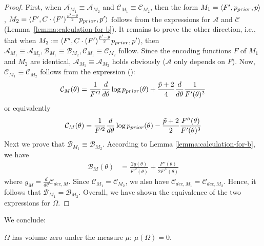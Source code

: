 \begin{proof}
  First, when $\mathcal{A}_{M_1} \equiv \mathcal{A}_{M_2}$ and $\mathcal{C}_{M_1} \equiv \mathcal{C}_{M_2}$, then the form $M_1 = \langle F',p_{prior}, p\rangle $, $M_2 = \langle F',C \cdot (F')^{\frac{\tilde{p'}-\tilde{p}}{2}} p_{prior}, p'\rangle$ follows from the expressions for $\mathcal{A}$ and $\mathcal{C}$ (Lemma~\ref{lemma:calculation-for-b}).
    It remains to prove the other direction, i.e., that when $M_2 := \langle F',C \cdot (F')^{\frac{\tilde{p}'-\tilde{p}}{2}} p_{prior}, p')$, then
    $\mathcal{A}_{M_1} \equiv \mathcal{A}_{M_2}, \mathcal{B}_{M_1} \equiv \mathcal{B}_{M_2}, \mathcal{C}_{M_1} \equiv \mathcal{C}_{M_2}$ follow.
    Since the encoding functions $F$ of $M_1$ and $M_2$ are identical, $\mathcal{A}_{M_1} \equiv \mathcal{A}_{M_2}$ holds obviously ($\mathcal{A}$ only depends on $F$).
Now, $\mathcal{C}_{M_1} \equiv \mathcal{C}_{M_2}$ follows from the expression (\label{eq:c-coefficient}):
\begin{equation}
    \mathcal{C}_M(\theta) = \frac{1}{F'^2} \frac{d}{d\theta} \log p_{prior}(\theta) + \frac{\tilde{p}+2}{4} \frac{d}{d\theta} \frac{1}{F'(\theta)^2} 
        \end{equation}
or equivalently
    \begin{equation*}
        \mathcal{C}_M(\theta) = \frac{1}{F'^2} \frac{d}{d\theta} \log p_{prior}(\theta) - \frac{\tilde{p}+2}{2}\frac{F''(\theta)}{F'(\theta)^3}
    \end{equation*}
    Next we prove that $\mathcal{B}_{M_1} \equiv \mathcal{B}_{M_2}$. According to Lemma \ref{lemma:calculation-for-b}, we have 
    \begin{align*}
    \mathcal{B}_M(\theta) &= \frac{2g(\theta)}{F'^2(\theta)} + \frac{F''(\theta)}{2F'^6(\theta)}
    \end{align*}
    where $g_M = \frac{d}{d\theta} \mathcal{C}_{dec,M}$.
    Since $\mathcal{C}_{M_1} = \mathcal{C}_{M_2}$, we also have $\mathcal{C}_{dec,M_1} = \mathcal{C}_{dec,M_2}$.
    Hence, it follows that 
    $\mathcal{B}_{M_1} = \mathcal{B}_{M_2}$. 
Overall, we have shown the equivalence of the two expressions for $\Omega$.
\end{proof}

We conclude:
\begin{corollary}\label{lemma:statements-omega}\label{lemma:measure-zero}
        $\Omega$ has volume zero under the measure $\mu$: $\mu(\Omega) = 0$.  
\end{corollary}



